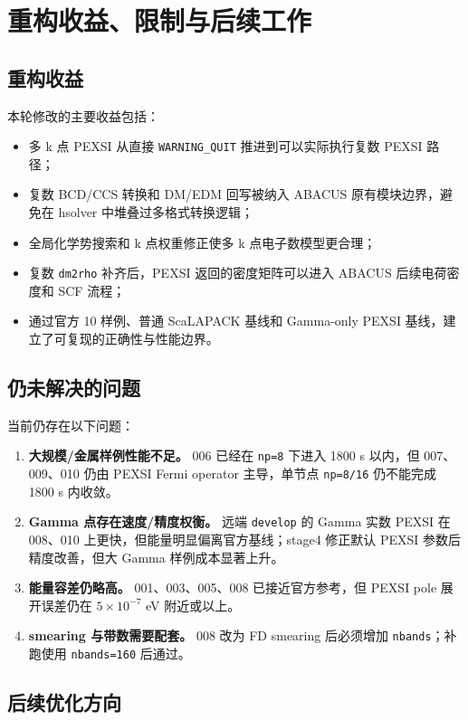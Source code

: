 \documentclass[a4paper,11pt]{article}
\newcommand{\code}[1]{\texttt{#1}}
\begin{document}
\section{重构收益、限制与后续工作}

\subsection{重构收益}

本轮修改的主要收益包括：

\begin{itemize}
    \item 多 k 点 PEXSI 从直接 \code{WARNING\_QUIT} 推进到可以实际执行复数 PEXSI 路径；
    \item 复数 BCD/CCS 转换和 DM/EDM 回写被纳入 ABACUS 原有模块边界，避免在 hsolver 中堆叠过多格式转换逻辑；
    \item 全局化学势搜索和 k 点权重修正使多 k 点电子数模型更合理；
    \item 复数 \code{dm2rho} 补齐后，PEXSI 返回的密度矩阵可以进入 ABACUS 后续电荷密度和 SCF 流程；
    \item 通过官方 10 样例、普通 ScaLAPACK 基线和 Gamma-only PEXSI 基线，建立了可复现的正确性与性能边界。
\end{itemize}

\subsection{仍未解决的问题}

当前仍存在以下问题：

\begin{enumerate}
    \item \textbf{大规模/金属样例性能不足。} 006 已经在 \code{np=8} 下进入 1800 s 以内，但 007、009、010 仍由 PEXSI Fermi operator 主导，单节点 \code{np=8/16} 仍不能完成 1800 s 内收敛。
    \item \textbf{Gamma 点存在速度/精度权衡。} 远端 \code{develop} 的 Gamma 实数 PEXSI 在 008、010 上更快，但能量明显偏离官方基线；stage4 修正默认 PEXSI 参数后精度改善，但大 Gamma 样例成本显著上升。
    \item \textbf{能量容差仍略高。} 001、003、005、008 已接近官方参考，但 PEXSI pole 展开误差仍在 \(5\times10^{-7}\) eV 附近或以上。
    \item \textbf{smearing 与带数需要配套。} 008 改为 FD smearing 后必须增加 \code{nbands}；补跑使用 \code{nbands=160} 后通过。
\end{enumerate}

\subsection{后续优化方向}
\end{document}
